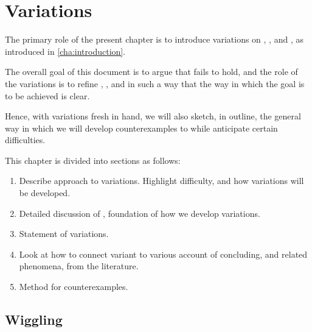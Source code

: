 \chapter{Variations}
\label{cha:var}

\begin{note}
  The primary role of the present chapter is to introduce variations on \qWhy{}, \qHow{}, and \issueInclusion{}, as introduced in \autoref{cha:introduction}.

  The overall goal of this document is to argue that \issueInclusion{} fails to hold, and the role of the variations is to refine \qWhy{}, \qHow{}, and \issueInclusion{} in such a way that the way in which the goal is to be achieved is clear.

  Hence, with variations fresh in hand, we will also sketch, in outline, the general way in which we will develop counterexamples to \issueInclusion{} while anticipate certain difficulties.
\end{note}

\begin{note}
  This chapter is divided into sections as follows:
  \begin{enumerate}[label=]
  \item

    Describe approach to variations.
    Highlight difficulty, and how variations will be developed.
  \item

    Detailed discussion of , foundation of how we develop variations.
  \item

    Statement of variations.
  \item

    Look at how to connect variant to various account of concluding, and related phenomena, from the literature.
  \item

    Method for counterexamples.
  \end{enumerate}
\end{note}

\section{Wiggling}
\label{cha:var:sec:wiggling}

